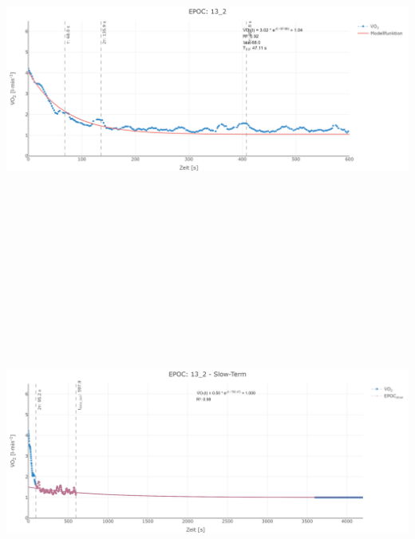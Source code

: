 \documentclass[
  letterpaper,
  DIV=11]{scrartcl}
\begin{document}
\includegraphics[width=11.45833in,height=4.6875in]{images/13_2_tau.png}
\includegraphics[width=11.45833in,height=4.6875in]{images/13_2_slow.png}
\end{document}

